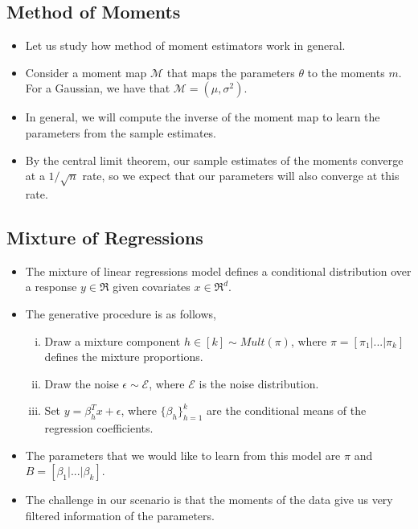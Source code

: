 \documentclass[tablecaption=bottom]{jmlr}
\begin{document}
\subsection{Method of Moments}

\begin{itemize}
\item
  Let us study how method of moment estimators work in general.
\item
  Consider a moment map $\mathcal{M}$ that maps the parameters $\theta$
  to the moments $m$. For a Gaussian, we have that
  $\mathcal{M} = (\mu, \sigma^2)$.
\item
  In general, we will compute the inverse of the moment map to learn the
  parameters from the sample estimates.
\item
  By the central limit theorem, our sample estimates of the moments
  converge at a $1/\sqrt{n}$ rate, so we expect that our parameters will
  also converge at this rate.
\end{itemize}
\subsection{Mixture of Regressions}

\begin{itemize}
\item
  The mixture of linear regressions model defines a conditional
  distribution over a response $y \in \Re$ given covariates
  $x \in \Re^d$.
\item
  The generative procedure is as follows,
  \begin{enumerate}[i)]
  \item
    Draw a mixture component $h \in [k] \sim Mult(\pi)$, where
    $\pi = [\pi_1 | ... | \pi_k]$ defines the mixture proportions.
  \item
    Draw the noise $\epsilon \sim \mathcal{E}$, where $\mathcal{E}$ is
    the noise distribution.
  \item
    Set $y = \beta_h^T x + \epsilon$, where $\{\beta_h\}_{h=1}^{k}$ are
    the conditional means of the regression coefficients.
  \end{enumerate}
\item
  The parameters that we would like to learn from this model are $\pi$
  and $B = [ \beta_1 | ... | \beta_k ]$.
\item
  The challenge in our scenario is that the moments of the data give us
  very filtered information of the parameters.
\end{itemize}
\end{document}
